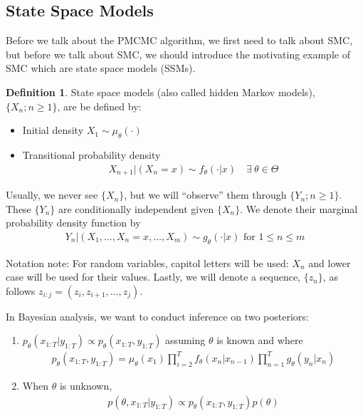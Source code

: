\documentclass{article}\usepackage[]{graphicx}\usepackage[]{color}
\theoremstyle{definition}
\newtheorem{definition}{Definition}[section]
\begin{document}
\subsection{State Space Models}

Before we talk about the PMCMC algorithm, we first need to talk about SMC, but before we talk about SMC, we should introduce the motivating example of SMC which are state space models (SSMs). 

\theoremstyle{definition}
\begin{definition}
State space models (also called hidden Markov models), $\{ X_n ; n \geq 1 \}$, are be defined by:
\begin{itemize}
  \item Initial density $X_1 \sim \mu_\theta(\cdot)$
  \item Transitional probability density 
  \begin{align}
  X_{n+1}|(X_n = x) \sim f_\theta(\cdot|x) \quad \exists \> \theta \in \Theta
  \end{align}
\end{itemize}
\end{definition}

Usually, we never see $\{ X_n \}$, but we will ``observe'' them through $\{ Y_n ; n \geq 1 \}$. These $\{ Y_n \}$ are conditionally independent given $\{ X_n \}$. We denote their marginal probability density function by 
\begin{align}
Y_n | (X_1,\ldots,X_n = x,\ldots,X_m) \sim g_\theta(\cdot|x) \text{ for } 1 \leq n \leq m
\end{align}

Notation note: For random variables, capitol letters will be used: $X_n$ and lower case will be used for their values. Lastly, we will denote a sequence, $\{ z_n \}$, as follows $z_{i:j} = (z_i, z_{i+1},\ldots,z_j)$.

In Bayesian analysis, we want to conduct inference on two posteriors:
\begin{enumerate}
  \item $p_\theta(x_{1:T}|y_{1:T}) \propto p_\theta(x_{1:T}, y_{1:T})$ assuming $\theta$ is known and where 
  \begin{align}
    p_\theta(x_{1:T}, y_{1:T}) = \mu_\theta(x_1) \prod \limits_{i=2}^T f_\theta(x_n | x_{n-1}) \prod \limits_{n=1}^T g_\theta (y_n | x_n)
  \end{align}
  \item When $\theta$ is unknown,
  \begin{align}
    p(\theta, x_{1:T} | y_{1:T}) \propto p_\theta(x_{1:T}, y_{1:T}) p(\theta)
  \end{align}
\end{enumerate}
\end{document}
